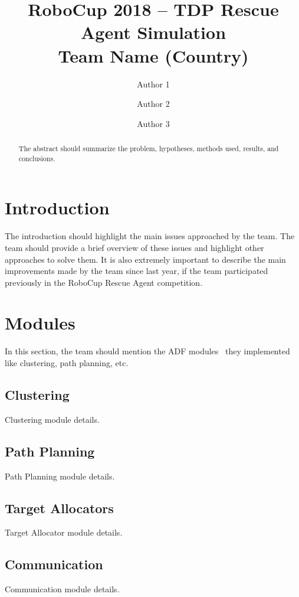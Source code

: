 \documentclass[runningheads,a4paper]{llncs}
\begin{document}
\title{RoboCup 2018 -- TDP Rescue Agent Simulation\\
	Team Name (Country)}
\author{Author 1 \and Author 2 \and Author 3}
\maketitle
\begin{abstract}
The abstract should summarize the problem, hypotheses, methods used, results, and conclusions.
\end{abstract}
\section{Introduction}
The introduction should highlight the main issues approached by the team. The 
team should provide a brief overview of these issues and highlight other 
approaches to solve them. It is also extremely important to describe the main 
improvements made by the team since last year, if the team participated 
previously in the RoboCup Rescue Agent competition.
\section{Modules}
In this section, the team should mention the ADF modules~\cite{ref1} they 
implemented like clustering, path planning, etc.
\subsection{Clustering}
Clustering module details.
\subsection{Path Planning}
Path Planning module details.
\subsection{Target Allocators}
Target Allocator module details.
\subsection{Communication}
Communication module details.
\end{document}
